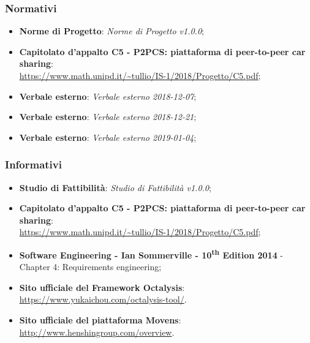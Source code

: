 \subsubsection{Normativi}
\begin{itemize}
	\item \textbf{Norme di Progetto}: \textit{Norme di Progetto v1.0.0};

	\item \textbf{Capitolato d'appalto C5 - P2PCS: piattaforma di peer-to-peer car sharing}: \\ \url{ https://www.math.unipd.it/~tullio/IS-1/2018/Progetto/C5.pdf};
	\item \textbf{Verbale esterno}: \textit{Verbale esterno 2018-12-07};
	\item \textbf{Verbale esterno}: \textit{Verbale esterno 2018-12-21};
	\item \textbf{Verbale esterno}: \textit{Verbale esterno 2019-01-04};
\end{itemize}
\subsubsection{Informativi}
\begin{itemize}
	\item \textbf{Studio di Fattibilità}: \textit{Studio di Fattibilità v1.0.0};
	\item \textbf{Capitolato d'appalto C5 - P2PCS: piattaforma di peer-to-peer car sharing}: \\ \url{ https://www.math.unipd.it/~tullio/IS-1/2018/Progetto/C5.pdf};
	\item \textbf{Software Engineering - Ian Sommerville - 10\textsuperscript{th} Edition 2014}
	\subitem - Chapter 4: Requirements engineering;
	\item \textbf{Sito ufficiale del Framework Octalysis}: \\ \textsf{\url{https://www.yukaichou.com/octalysis-tool/}}. 
	\item \textbf{Sito ufficiale del piattaforma Movens}: \\ \textsf{\url{http://www.henshingroup.com/overview}}. 

\end{itemize}